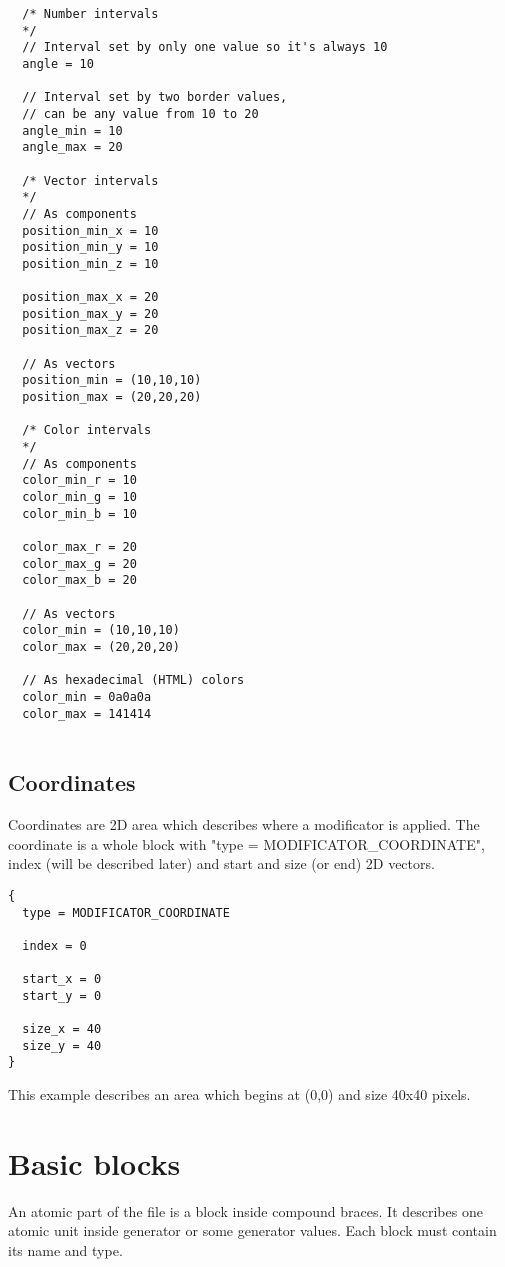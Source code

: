 \documentclass[9pt]{article}
\begin{document}
\begin{verbatim}
  /* Number intervals
  */
  // Interval set by only one value so it's always 10
  angle = 10
  
  // Interval set by two border values, 
  // can be any value from 10 to 20
  angle_min = 10
  angle_max = 20 
  
  /* Vector intervals
  */ 
  // As components
  position_min_x = 10
  position_min_y = 10
  position_min_z = 10
  
  position_max_x = 20
  position_max_y = 20
  position_max_z = 20
  
  // As vectors
  position_min = (10,10,10)
  position_max = (20,20,20)
  
  /* Color intervals
  */
  // As components
  color_min_r = 10
  color_min_g = 10
  color_min_b = 10
  
  color_max_r = 20
  color_max_g = 20
  color_max_b = 20
  
  // As vectors
  color_min = (10,10,10)
  color_max = (20,20,20)
  
  // As hexadecimal (HTML) colors
  color_min = 0a0a0a
  color_max = 141414
  
\end{verbatim}

\subsection{Coordinates}

Coordinates are 2D area which describes 
where a modificator is applied.  The coordinate is a whole 
block with "type = MODIFICATOR\_COORDINATE", index (will be described later)
and start and size (or end) 2D vectors.

\begin{verbatim}
{
  type = MODIFICATOR_COORDINATE

  index = 0

  start_x = 0
  start_y = 0

  size_x = 40
  size_y = 40
}
\end{verbatim}

This example describes an area which begins at (0,0) and size 40x40 pixels.

\section{Basic blocks}

An atomic part of the file is a block inside compound braces. It describes one 
atomic unit inside generator or some generator values. Each block must
contain its name and type.
\end{document}
